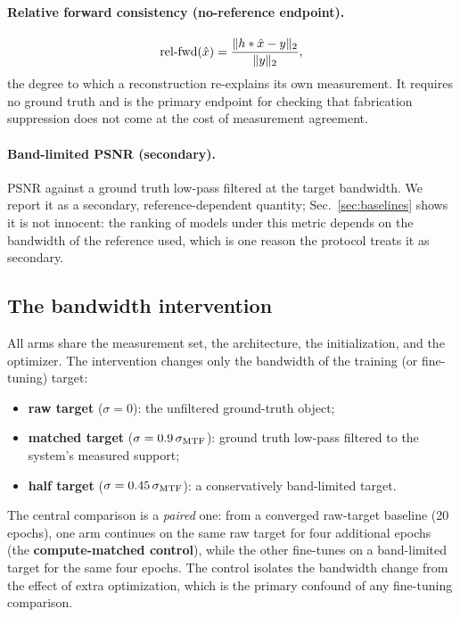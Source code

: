 \paragraph{Relative forward consistency (no-reference endpoint).}
\begin{equation}
\mathrm{rel\text{-}fwd}(\hat{x}) = \frac{\lVert h \ast \hat{x} - y \rVert_2}{\lVert y \rVert_2},
\label{eq:relfwd}
\end{equation}
the degree to which a reconstruction re-explains its own measurement. It requires no ground truth and is the primary endpoint for checking that fabrication suppression does not come at the cost of measurement agreement.

\paragraph{Band-limited PSNR (secondary).}
PSNR against a ground truth low-pass filtered at the target bandwidth. We report it as a secondary, reference-dependent quantity; Sec.~\ref{sec:baselines} shows it is not innocent: the ranking of models under this metric depends on the bandwidth of the reference used, which is one reason the protocol treats it as secondary.

\subsection{The bandwidth intervention}
All arms share the measurement set, the architecture, the initialization, and the optimizer. The intervention changes only the bandwidth of the training (or fine-tuning) target:
\begin{itemize}
\item \textbf{raw target} ($\sigma = 0$): the unfiltered ground-truth object;
\item \textbf{matched target} ($\sigma = 0.9\,\sigma_{\operatorname{MTF}}$): ground truth low-pass filtered to the system's measured support;
\item \textbf{half target} ($\sigma = 0.45\,\sigma_{\operatorname{MTF}}$): a conservatively band-limited target.
\end{itemize}
The central comparison is a \emph{paired} one: from a converged raw-target baseline (20 epochs), one arm continues on the same raw target for four additional epochs (the \textbf{compute-matched control}), while the other fine-tunes on a band-limited target for the same four epochs. The control isolates the bandwidth change from the effect of extra optimization, which is the primary confound of any fine-tuning comparison.

